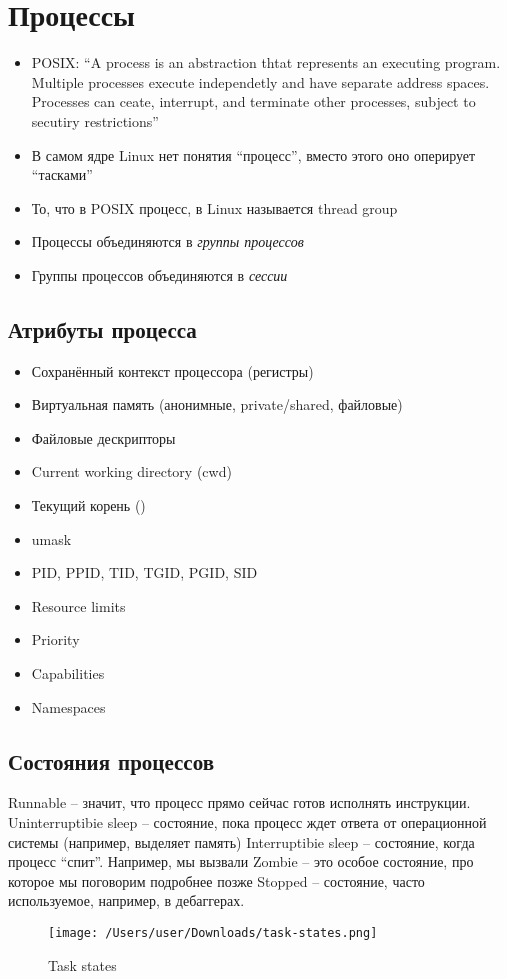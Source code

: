 \section{Процессы}
    \begin{itemize}
      \item POSIX: ``A process is an abstraction thtat represents an executing program. Multiple processes execute independetly and have separate address spaces. Processes can ceate, interrupt, and terminate other processes, subject to secutiry restrictions''
      \item В самом ядре Linux нет понятия ``процесс'', вместо этого оно оперирует ``тасками''
      \item То, что в POSIX процесс, в Linux называется thread group
      \item Процессы объединяются в \textit{группы процессов}
      \item Группы процессов объединяются в \textit{сессии}
    \end{itemize}
  
  \subsection{Атрибуты процесса}
    \begin{itemize}
      \item Сохранённый контекст процессора (регистры)
      \item Виртуальная память (анонимные, private/shared, файловые)
      \item Файловые дескрипторы
      \item Current working directory (cwd)
      \item Текущий корень ()
      \item umask
      \item PID, PPID, TID, TGID, PGID, SID
      \item Resource limits
      \item Priority
      \item Capabilities
      \item Namespaces
    \end{itemize}
  
  \subsection{Состояния процессов}
    Runnable -- значит, что процесс прямо сейчас готов исполнять инструкции.
    Uninterruptibie sleep -- состояние, пока процесс ждет ответа от операционной системы (например, выделяет память)
    Interruptibie sleep -- состояние, когда процесс ``спит''. Например, мы вызвали 
    Zombie -- это особое состояние, про которое мы поговорим подробнее позже
    Stopped -- состояние, часто используемое, например, в дебаггерах.
\begin{figure}[H]
\centering
  \texttt{[image: /Users/user/Downloads/task-states.png]}
  \caption{Task states}
  \label{fig:task_states}
\end{figure}  
  

